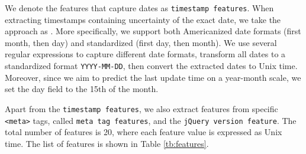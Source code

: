 We denote the features that capture dates as \texttt{timestamp features}. When extracting timestamps containing uncertainty of the exact date, we take the approach as \citet{berberich2010language}. More specifically, we support both Americanized date formats (first month, then day) and standardized (first day, then month). We use several regular expressions to capture different date formats, transform all dates to a standardized format \texttt{YYYY-MM-DD}, then convert the extracted dates to Unix time. Moreover, since we aim to predict the last update time on a year-month scale, we set the day field to the 15th of the month.

Apart from the \texttt{timestamp features}, we also extract features from specific \texttt{<meta>} tags, called \texttt{meta tag features}, and the \texttt{jQuery version feature}. The total number of features is 20, where each feature value is expressed as Unix time. The list of features is shown in Table \ref{tb:features}.

